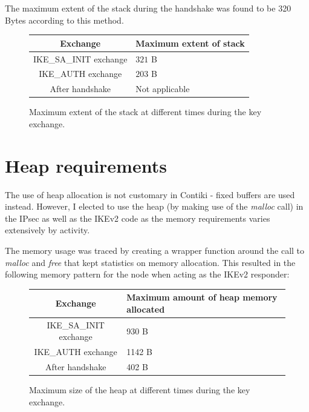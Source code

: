 \documentclass[final,a4paper,twoside,11pt,onecolumn]{report}
\begin{document}
The maximum extent of the stack during the handshake was found to be 320 Bytes according to this method.

\begin{figure}[h]
\centering
\label{tab:eval-stack}
\begin{tabular}{c|l}
Exchange                      & Maximum extent of stack  \\ \hline
IKE\_SA\_INIT exchange      & $321$ B                    \\
IKE\_AUTH exchange          & $203$ B                    \\
After handshake            & Not applicable
\end{tabular}
\caption{Maximum extent of the stack at different times during the key exchange.}
\end{figure}

\section{Heap requirements}
The use of heap allocation is not customary in Contiki - fixed buffers are used instead. However, I elected to use the heap (by making use of the \emph{malloc} call) in the IPsec as well as the IKEv2 code as the memory requirements varies extensively by activity.

The memory usage was traced by creating a wrapper function around the call to \emph{malloc} and \emph{free} that kept statistics on memory allocation. This resulted in the following memory pattern for the node when acting as the IKEv2 responder:


\begin{figure}[h]
\centering
\label{tab:eval-heap}
\begin{tabular}{c|l}
Exchange                      & Maximum amount of heap memory allocated    \\ \hline
IKE\_SA\_INIT exchange        & 930 B                                      \\
IKE\_AUTH exchange            & 1142 B                                     \\
After handshake               & 402 B
\end{tabular}
\caption{Maximum size of the heap at different times during the key exchange.}
\end{figure}
\end{document}
